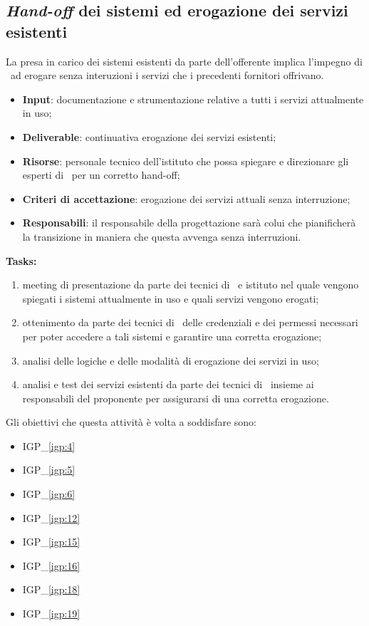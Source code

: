 	\subsection{\textit{Hand-off} dei sistemi ed erogazione dei servizi esistenti}
		
		La presa in carico dei sistemi esistenti da parte dell'offerente implica l'impegno di \azienda~ad erogare senza interuzioni i servizi che i precedenti fornitori offrivano.
		
		\begin{itemize}[noitemsep]
			\renewcommand\labelitemi{--}
			\item \textbf{Input}: documentazione e strumentazione relative a tutti i servizi attualmente in uso;
			\item \textbf{Deliverable}: continuativa erogazione dei servizi esistenti;
			\item \textbf{Risorse}: personale tecnico dell'istituto che possa spiegare e direzionare gli esperti di \azienda~per un corretto hand-off;
			\item \textbf{Criteri di accettazione}: erogazione dei servizi attuali senza interruzione;
			\item \textbf{Responsabili}: il responsabile della progettazione sarà colui che pianificherà la transizione in maniera che questa avvenga senza interruzioni.
		\end{itemize}
		
		\textbf{Tasks:}
		\begin{enumerate}[noitemsep]
			\item meeting di presentazione da parte dei tecnici di \azienda~e istituto nel quale vengono spiegati i sistemi attualmente in uso e quali servizi vengono erogati;
			\item ottenimento da parte dei tecnici di \azienda~delle credenziali e dei permessi necessari per poter accedere a tali sistemi e garantire una corretta erogazione;
			\item analisi delle logiche e delle modalità di erogazione dei servizi in uso;
			\item analisi e test dei servizi esistenti da parte dei tecnici di \azienda~insieme ai responsabili del proponente per assigurarsi di una corretta erogazione.
		\end{enumerate}
	
		Gli obiettivi che questa attività è volta a soddisfare sono:
		\begin{itemize}[noitemsep]
			\renewcommand\labelitemi{--}
			\item {\color{pantone}IGP\_\ref{igp:4}}
			\item {\color{pantone}IGP\_\ref{igp:5}}
			\item {\color{pantone}IGP\_\ref{igp:6}}
			\item {\color{pantone}IGP\_\ref{igp:12}}
			\item {\color{pantone}IGP\_\ref{igp:15}}
			\item {\color{pantone}IGP\_\ref{igp:16}}
			\item {\color{pantone}IGP\_\ref{igp:18}}
			\item {\color{pantone}IGP\_\ref{igp:19}}
		\end{itemize}


